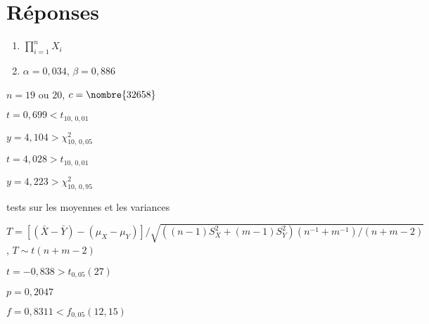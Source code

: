 \bigskip
\section*{Réponses}

\begin{reponse}{6.2}
    \begin{enumerate}
    \item $\prod_{i = 1}^n X_i$
    \item $\alpha = 0,034$, $\beta = 0,886$
    \end{enumerate}
  
\end{reponse}
\begin{reponse}{6.4}
    $n = 19 \text{ ou } 20$, $c = \nombre{32658}$
  
\end{reponse}
\begin{reponse}{6.5}
    \begin{inparaenum}
    \item $t = 0,699 < t_{10, \, 0,01}$
    \item $y = 4,104 > \chi_{10, \,0,05}^2$
    \end{inparaenum}
  
\end{reponse}
\begin{reponse}{6.6}
    \begin{inparaenum}
    \item $t = 4,028 > t_{10, \,0,01}$
    \item $y = 4,223 > \chi_{10, \, 0,95}^2$
    \item tests sur les moyennes et les variances
    \end{inparaenum}
  
\end{reponse}
\begin{reponse}{6.7}
    \begin{inparaenum}
    \item $T = [(\bar{X} - \bar{Y}) - (\mu_X - \mu_Y)]/\sqrt{((n-1)S_X^2 +
            (m-1)S_Y^2) (n^{-1} + m^{-1})/(n + m - 2)}$, $T \sim
        t(n + m - 2)$
    \item $t = -0,838 > t_{0,05}(27)$
    \item $p = 0,2047$
    \item $f = 0,8311 < f_{0,05}(12, 15)$
    \end{inparaenum}
  
\end{reponse}
